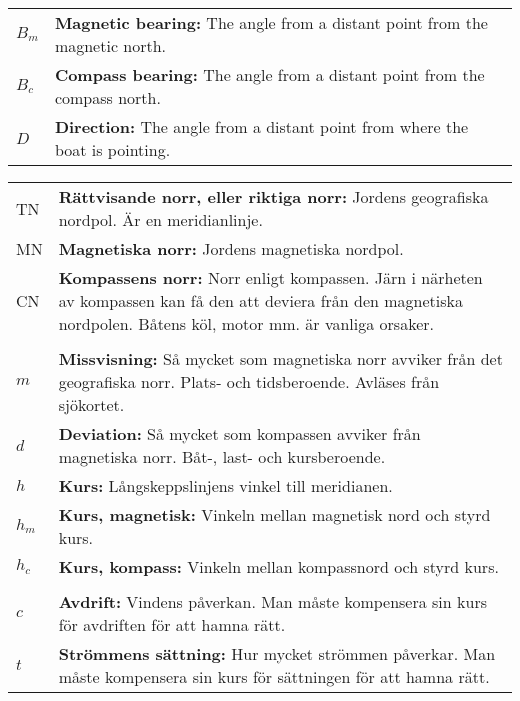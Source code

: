 \documentclass[a4paper, 12pt]{article}
\newcommand{\textabbrtruenorth}{TN}
\newcommand{\textabbrmagneticnorth}{MN}
\newcommand{\textabbrcompassnorth}{CN}
\newcommand{\textmathbearingmagnetic}{B_m}
\newcommand{\textmathbearingcompass}{B_c}
\newcommand{\textmathdirection}{D}
\newcommand{\textmathmagneticvariation}{m}
\newcommand{\textmathdeviation}{d}
\newcommand{\textmathheading}{h}
\newcommand{\textmathheadingmagnetic}{h_m}
\newcommand{\textmathheadingcompass}{h_c}
\newcommand{\textmathcrosswind}{c}
\newcommand{\textmathtidal}{t}
\newcommand{\textabbrtruenorth}{RN}
\newcommand{\textabbrmagneticnorth}{MN}
\newcommand{\textabbrcompassnorth}{KN}
\newcommand{\textmathbearingmagnetic}{B_m}
\newcommand{\textmathbearingcompass}{B_k}
\newcommand{\textmathdirection}{R}
\newcommand{\textmathmagneticvariation}{m}
\newcommand{\textmathdeviation}{d}
\newcommand{\textmathheading}{k}
\newcommand{\textmathheadingmagnetic}{k_m}
\newcommand{\textmathheadingcompass}{k_k}
\newcommand{\textmathcrosswind}{a}
\newcommand{\textmathtidal}{s}
\begin{document}
{\begin{tabular}{p{} p{}}
    $\textmathbearingmagnetic$   & \textbf{Magnetic bearing:} The angle from a distant point from the magnetic north.\\
    $\textmathbearingcompass$    & \textbf{Compass bearing:} The angle from a distant point from the compass north.\\
    $\textmathdirection$         & \textbf{Direction:} The angle from a distant point from where the boat is pointing.\\
  \end{tabular}
}{
  \clearpage
  \noindent
  \begin{tabular}{p{} p{}}
    \textabbrtruenorth           & \textbf{Rättvisande norr, eller riktiga norr:} Jordens geografiska nordpol. Är en meridianlinje.\\
    \textabbrmagneticnorth       & \textbf{Magnetiska norr:} Jordens magnetiska nordpol.\\
    \textabbrcompassnorth        & \textbf{Kompassens norr:} Norr enligt kompassen. Järn i närheten av kompassen kan få den att deviera från den magnetiska nordpolen. Båtens köl, motor mm. är vanliga orsaker.\\
                                 & \\
    $\textmathmagneticvariation$ & \textbf{Missvisning:} Så mycket som magnetiska norr avviker från det geo\-grafiska norr. Plats- och tidsberoende. Avläses från sjökortet.\\
    $\textmathdeviation$         & \textbf{Deviation:} Så mycket som kompassen avviker från magnetiska norr. Båt-, last- och kursberoende.\\
    $\textmathheading$           & \textbf{Kurs:} Långskeppslinjens vinkel till meridianen.\\
    $\textmathheadingmagnetic$   & \textbf{Kurs, magnetisk:} Vinkeln mellan magnetisk nord och styrd kurs.\\
    $\textmathheadingcompass$    & \textbf{Kurs, kompass:} Vinkeln mellan kompassnord och styrd kurs.\\
                                 & \\
    $\textmathcrosswind$         & \textbf{Avdrift:} Vindens påverkan. Man måste kompensera sin kurs för avdriften för att hamna rätt.\\
    $\textmathtidal$             & \textbf{Strömmens sättning:} Hur mycket strömmen påverkar. Man måste kompensera sin kurs för sättningen för att hamna rätt.\\

\end{tabular}}
\end{document}

